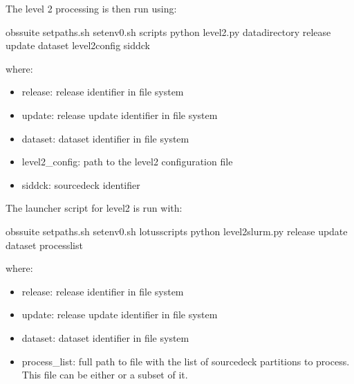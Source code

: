 \documentclass[letterpaper,10pt,english]{sphinxmanual}
\begin{document}
The level 2 processing is then run using:

\begin{sphinxVerbatim}[commandchars=\\\{\}]
 obs\PYGZhy{}suite
 setpaths.sh
 setenv0.sh
 scripts
python level2.py data\PYGZus{}directory release update dataset level2\PYGZus{}config sid\PYGZhy{}dck
\end{sphinxVerbatim}

where:
\begin{itemize}
\item {}
release: release identifier in file system

\item {}
update: release update identifier in file system

\item {}
dataset: dataset identifier in file system

\item {}
level2\_config: path to the level2 configuration file

\item {}
sid\sphinxhyphen{}dck: source\sphinxhyphen{}deck identifier

\end{itemize}

The launcher script for level2 is run with:

\begin{sphinxVerbatim}[commandchars=\\\{\}]
 obs\PYGZhy{}suite
 setpaths.sh
 setenv0.sh
 lotus\PYGZus{}scripts
python level2\PYGZus{}slurm.py release update dataset  process\PYGZus{}list
\end{sphinxVerbatim}

where:
\begin{itemize}
\item {}
release: release identifier in file system

\item {}
update: release update identifier in file system

\item {}
dataset: dataset identifier in file system

\item {}
process\_list: full path to file with the list of source\sphinxhyphen{}deck partitions to
process. This file can be either {\hyperref[\detokenize{index:process-list-file}]{}} or a subset of it.

\end{itemize}
\end{document}
